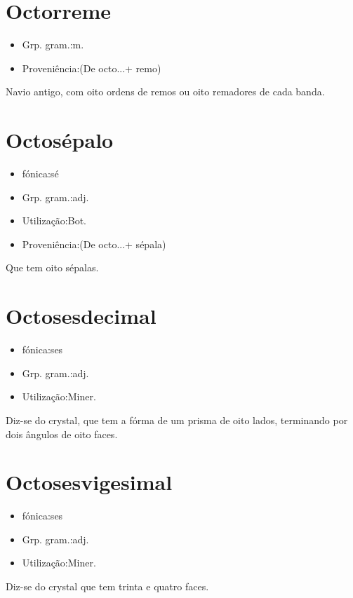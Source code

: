 \section{Octorreme}
\begin{itemize}
\item {Grp. gram.:m.}
\end{itemize}
\begin{itemize}
\item {Proveniência:(De \textunderscore octo...\textunderscore  + \textunderscore remo\textunderscore )}
\end{itemize}
Navio antigo, com oito ordens de remos ou oito remadores de cada banda.
\section{Octosépalo}
\begin{itemize}
\item {fónica:sé}
\end{itemize}
\begin{itemize}
\item {Grp. gram.:adj.}
\end{itemize}
\begin{itemize}
\item {Utilização:Bot.}
\end{itemize}
\begin{itemize}
\item {Proveniência:(De \textunderscore octo...\textunderscore  + \textunderscore sépala\textunderscore )}
\end{itemize}
Que tem oito sépalas.
\section{Octosesdecimal}
\begin{itemize}
\item {fónica:ses}
\end{itemize}
\begin{itemize}
\item {Grp. gram.:adj.}
\end{itemize}
\begin{itemize}
\item {Utilização:Miner.}
\end{itemize}
Diz-se do crystal, que tem a fórma de um prisma de oito lados, terminando por dois ângulos de oito faces.
\section{Octosesvigesimal}
\begin{itemize}
\item {fónica:ses}
\end{itemize}
\begin{itemize}
\item {Grp. gram.:adj.}
\end{itemize}
\begin{itemize}
\item {Utilização:Miner.}
\end{itemize}
Diz-se do crystal que tem trinta e quatro faces.
